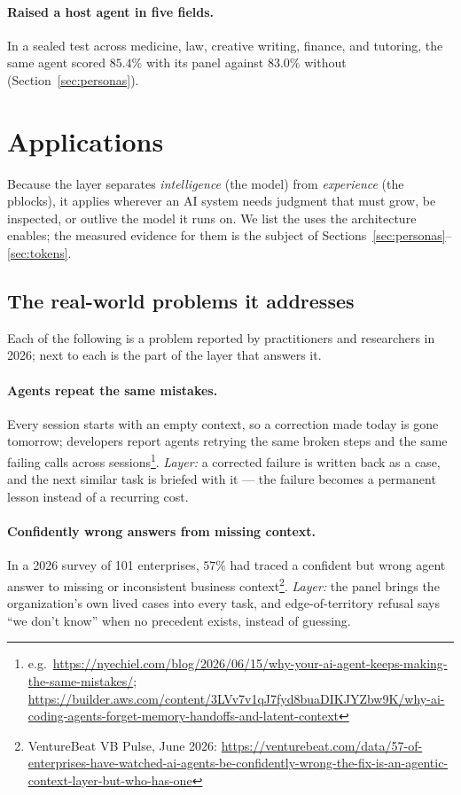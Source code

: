 \documentclass[11pt]{article}
\begin{document}
\paragraph{Raised a host agent in five fields.} In a sealed test across medicine, law, creative writing, finance, and tutoring, the same agent scored $85.4\%$ with its panel against $83.0\%$ without (Section~\ref{sec:personas}).

\section{Applications}
\label{sec:apps}

Because the layer separates \emph{intelligence} (the model) from \emph{experience} (the pblocks), it applies wherever an AI system needs judgment that must grow, be inspected, or outlive the model it runs on. We list the uses the architecture enables; the measured evidence for them is the subject of Sections~\ref{sec:personas}--\ref{sec:tokens}.

\subsection{The real-world problems it addresses}
\label{sec:problems}
Each of the following is a problem reported by practitioners and researchers in 2026; next to each is the part of the layer that answers it.

\paragraph{Agents repeat the same mistakes.} Every session starts with an empty context, so a correction made today is gone tomorrow; developers report agents retrying the same broken steps and the same failing calls across sessions\footnote{e.g.\ \url{https://nyechiel.com/blog/2026/06/15/why-your-ai-agent-keeps-making-the-same-mistakes/}; \url{https://builder.aws.com/content/3LVv7v1qJ7fyd8buaDIKJYZbw9K/why-ai-coding-agents-forget-memory-handoffs-and-latent-context}}. \emph{Layer:} a corrected failure is written back as a case, and the next similar task is briefed with it --- the failure becomes a permanent lesson instead of a recurring cost.

\paragraph{Confidently wrong answers from missing context.} In a 2026 survey of 101 enterprises, $57\%$ had traced a confident but wrong agent answer to missing or inconsistent business context\footnote{VentureBeat VB Pulse, June 2026: \url{https://venturebeat.com/data/57-of-enterprises-have-watched-ai-agents-be-confidently-wrong-the-fix-is-an-agentic-context-layer-but-who-has-one}}. \emph{Layer:} the panel brings the organization's own lived cases into every task, and edge-of-territory refusal says ``we don't know'' when no precedent exists, instead of guessing.
\end{document}
